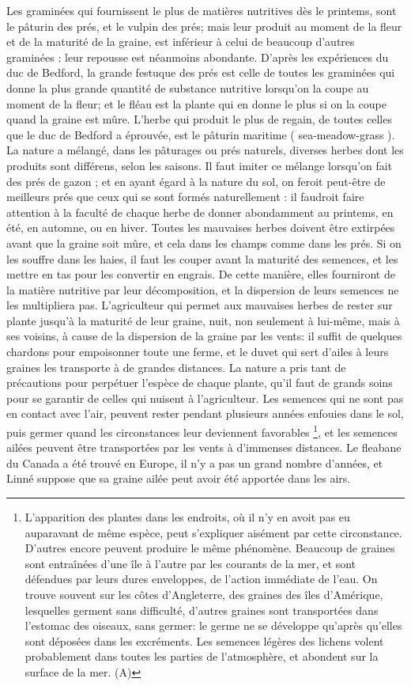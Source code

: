 \setcounter{page}{291} Les graminées qui fournissent le plus de matières nutritives dès le printems, sont le pâturin des prés, et le vulpin des prés; mais leur produit au moment de la fleur et de la maturité de la graine, est inférieur à celui de beaucoup d'autres graminées : leur repousse est néanmoins abondante. D'après les expériences du duc de Bedford, la grande festuque des prés est celle de toutes les graminées qui donne la plus grande quantité de substance nutritive lorsqu'on la coupe au moment de la fleur; et le fléau est la plante qui en donne le plus si on la coupe quand la graine est mûre. L'herbe qui produit le plus de regain, de toutes celles que le duc de Bedford a éprouvée, est le pâturin maritime ( sea-meadow-grass ). La nature a mélangé, dans les pâturages ou prés naturels, diverses herbes dont les produits sont différens, selon les saisons. Il faut imiter ce mélange lorsqu'on fait des prés de gazon ; et en ayant égard à la nature du sol, on feroit peut-être de meilleurs prés que ceux qui se sont formés naturellement : il faudroit faire attention à la faculté de chaque herbe de donner abondamment au printems, en été, en automne, ou en hiver.
\setcounter{page}{292} Toutes les mauvaises herbes doivent être extirpées avant que la graine soit mûre, et cela dans les champs comme dans les prés. Si on les souffre dans les haies, il faut les couper avant la maturité des semences, et les mettre en tas pour les convertir en engrais. De cette manière, elles fourniront de la matière nutritive par leur décomposition, et la dispersion de leurs semences ne les multipliera pas. L'agriculteur qui permet aux mauvaises herbes de rester sur plante jusqu'à la maturité de leur graine, nuit, non seulement à lui-même, mais à ses voisins, à cause de la dispersion de la graine par les vents: il suffit de quelques chardons pour empoisonner toute une ferme, et le duvet qui sert d'ailes à leurs graines les transporte à de grandes distances. La nature a pris tant de précautions pour perpétuer l'espèce de chaque plante, qu'il faut de grands soins pour se garantir de celles qui nuisent à l'agriculteur. Les semences qui ne sont pas en contact avec l'air, peuvent rester pendant plusieurs années enfouies dans le sol, puis germer quand les circonstances leur deviennent favorables \footnote{L'apparition des plantes dans les endroits, où il n'y en avoit pas eu auparavant de même espèce, peut s'expliquer aisément par cette circonstance. D'autres encore peuvent produire le même phénomène. Beaucoup de graines sont entraînées d'une île à l'autre par les courants de la mer, et sont défendues par leurs dures enveloppes, de l'action immédiate de l'eau. On trouve souvent sur les côtes d'Angleterre, des graines des îles d'Amérique, lesquelles germent sans difficulté, d'autres graines sont transportées dans l'estomac des oiseaux, sans germer: le germe ne se développe qu'après qu'elles sont déposées dans les excréments. Les semences légères des lichens volent probablement dans toutes les parties de l'atmosphère, et abondent sur la surface de la mer. (A)}, et les semences ailées peuvent\setcounter{page}{293} être transportées par les vents à d'immenses distances. Le fleabane du Canada a été trouvé en Europe, il n'y a pas un grand nombre d'années, et Linné suppose que sa graine ailée peut avoir été apportée dans les airs.
